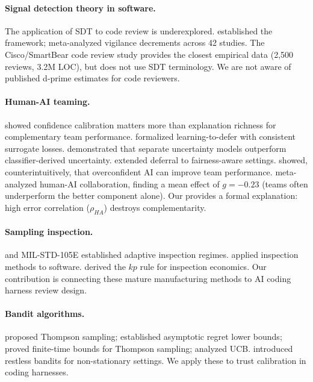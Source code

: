 \documentclass[11pt, a4paper, copyright]{googledeepmind}
\begin{document}
\paragraph{Signal detection theory in software.} The application of SDT to code review is underexplored. \citet{green1966signal} established the framework; \citet{see1995meta} meta-analyzed vigilance decrements across 42 studies. The Cisco/SmartBear code review study \citep{cohen2006best} provides the closest empirical data (2,500 reviews, 3.2M LOC), but does not use SDT terminology. We are not aware of published d-prime estimates for code reviewers.

\paragraph{Human-AI teaming.} \citet{bansal2021does} showed confidence calibration matters more than explanation richness for complementary team performance. \citet{mozannar2020consistent} formalized learning-to-defer with consistent surrogate losses. \citet{raghu2019direct} demonstrated that separate uncertainty models outperform classifier-derived uncertainty. \citet{madras2018predict} extended deferral to fairness-aware settings. \citet{vodrahalli2022uncalibrated} showed, counterintuitively, that overconfident AI can improve team performance. \citet{vaccaro2024combinations} meta-analyzed human-AI collaboration, finding a mean effect of $g = -0.23$ (teams often underperform the better component alone). Our  provides a formal explanation: high error correlation ($\rho_{HA}$) destroys complementarity.

\paragraph{Sampling inspection.} \citet{dodge1929method} and MIL-STD-105E \citep{milstd105e} established adaptive inspection regimes. \citet{fagan1976design} applied inspection methods to software. \citet{deming1986out} derived the $kp$ rule for inspection economics. Our contribution is connecting these mature manufacturing methods to AI coding harness review design.

\paragraph{Bandit algorithms.} \citet{thompson1933likelihood} proposed Thompson sampling; \citet{lai1985asymptotically} established asymptotic regret lower bounds; \citet{agrawal2012analysis} proved finite-time bounds for Thompson sampling; \citet{auer2002finite} analyzed UCB. \citet{whittle1988restless} introduced restless bandits for non-stationary settings. We apply these to trust calibration in coding harnesses.
\end{document}
